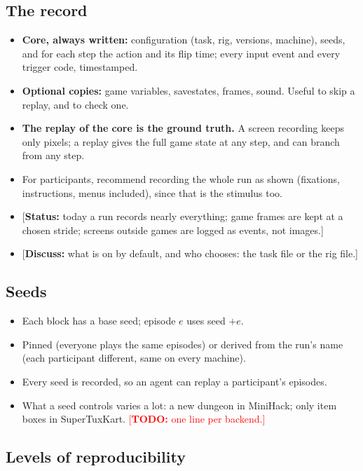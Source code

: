 \documentclass{article}
\newcommand{\TODO}[1]{\textcolor{red}{[\textbf{TODO:} #1]}}
\newcommand{\status}[1]{\textcolor{teal!70!black}{[\textbf{Status:} #1]}}
\newcommand{\question}[1]{\textcolor{blue!70!black}{[\textbf{Discuss:} #1]}}
\begin{document}
\subsection{The record}

\begin{itemize}
  \item \textbf{Core, always written:} configuration (task, rig, versions, machine), seeds, and for each step the action and its flip time; every input event and every trigger code, timestamped.
  \item \textbf{Optional copies:} game variables, savestates, frames, sound. Useful to skip a replay, and to check one.
  \item \textbf{The replay of the core is the ground truth.} A screen recording keeps only pixels; a replay gives the full game state at any step, and can branch from any step.
  \item For participants, recommend recording the whole run as shown (fixations, instructions, menus included), since that is the stimulus too.
  \item \status{today a run records nearly everything; game frames are kept at a chosen stride; screens outside games are logged as events, not images.}
  \item \question{what is on by default, and who chooses: the task file or the rig file.}
\end{itemize}

\subsection{Seeds}

\begin{itemize}
  \item Each block has a base seed; episode $e$ uses seed $+ e$.
  \item Pinned (everyone plays the same episodes) or derived from the run's name (each participant different, same on every machine).
  \item Every seed is recorded, so an agent can replay a participant's episodes.
  \item What a seed controls varies a lot: a new dungeon in MiniHack; only item boxes in SuperTuxKart. \TODO{one line per backend.}
\end{itemize}

\subsection{Levels of reproducibility}
\label{sec:levels}
\end{document}
